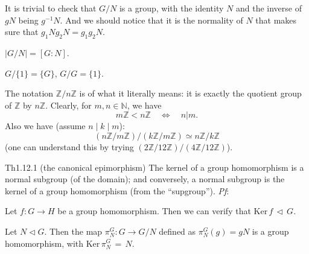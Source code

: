 \documentclass{article}
\newcommand{\nles}{\vartriangleleft}
\newcommand{\Ker}{\text{Ker}\,}
\begin{document}
\begin{Rmk}{}
    \begin{compactenum}
        \item It is trivial to check that $G/N$ is a group, \textcolor{Th}{with the identity $N$ and the inverse of $gN$ being $g^{-1}N$}. And we should notice that it is the normality of $N$ that makes sure that $g_1Ng_2N = g_1g_2N$.
        \item \textcolor{Th}{$|G/N| = [G:N]$}.
        \item \textcolor{Th}{$G/\{1\} = \{G\}$, $G/G = \{1\}$}.
        \item \textcolor{Th}{The notation $\mathbb{Z}/n\mathbb{Z}$ is of what it literally means: it is exactly the quotient group of $\mathbb{Z}$ by $n\mathbb{Z}$. Clearly, for $m,n\in\mathbb{N}$, we have
        $$ m\mathbb{Z}<n\mathbb{Z} \quad \Longleftrightarrow \quad n|m. $$
        Also we have (assume $n\mid k\mid m$):
        $$ (n\mathbb{Z}/m\mathbb{Z})\Big/ (k\mathbb{Z}/m\mathbb{Z}) \simeq n\mathbb{Z}/k\mathbb{Z} $$
        (one can understand this by trying $(2\mathbb{Z}/12\mathbb{Z})\big/ (4\mathbb{Z}/12\mathbb{Z})$).}
    \end{compactenum}
\end{Rmk}

\begin{Th}{Th1.12.1 (the canonical epimorphism)}
    The kernel of a group homomorphism is a normal subgroup (of the domain); and conversely, a normal subgroup is the kernel of a group homomorphism (from the ``supgroup'').
    \tcblower
    \textit{Pf}: 
    \begin{compactenum}
        \item Let $f: G\to H$ be a group homomorphism. Then we can verify that $\Ker f \,\nles\, G$.
        \item Let $N\nles G$. Then the map $\pi_N^G: G\to G/N$ defined as $\pi_N^G(g) = gN$ is a group homomorphism, with $\Ker \pi_N^G \,=\, N$.
    \end{compactenum}
\end{Th}
\end{document}
